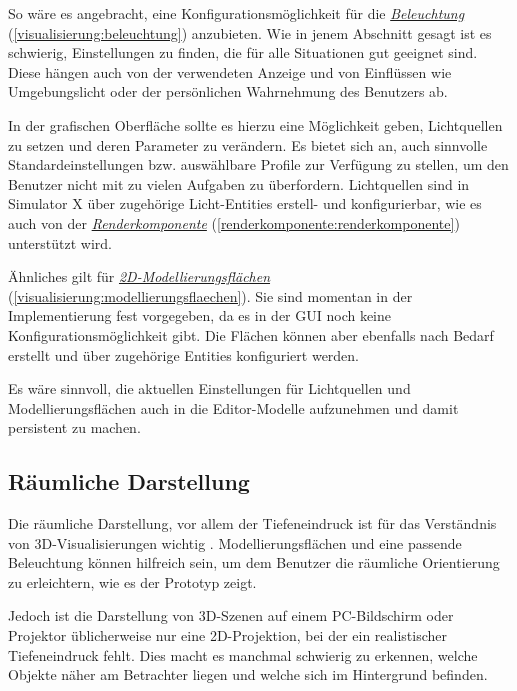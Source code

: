 \documentclass[a4paper,10pt]{sphinxmanual}
\begin{document}
So wäre es angebracht, eine Konfigurationsmöglichkeit für die {\hyperref[visualisierung:beleuchtung]{\emph{Beleuchtung}}} (\autoref*{visualisierung:beleuchtung}) anzubieten.
Wie in jenem Abschnitt gesagt ist es schwierig, Einstellungen zu finden, die für alle Situationen gut geeignet sind.
Diese hängen auch von der verwendeten Anzeige und von Einflüssen wie Umgebungslicht oder der persönlichen Wahrnehmung des Benutzers ab.

In der grafischen Oberfläche sollte es hierzu eine Möglichkeit geben, Lichtquellen zu setzen und deren Parameter zu verändern.
Es bietet sich an, auch sinnvolle Standardeinstellungen bzw. auswählbare Profile zur Verfügung zu stellen, um den Benutzer nicht mit zu vielen Aufgaben zu überfordern.
Lichtquellen sind in Simulator X über zugehörige Licht-Entities erstell- und konfigurierbar, wie es auch von der {\hyperref[renderkomponente:renderkomponente]{\emph{Renderkomponente}}} (\autoref*{renderkomponente:renderkomponente}) unterstützt wird.

Ähnliches gilt für {\hyperref[visualisierung:modellierungsflaechen]{\emph{2D-Modellierungsflächen}}} (\autoref*{visualisierung:modellierungsflaechen}). Sie sind momentan in der Implementierung fest vorgegeben, da es in der GUI noch keine Konfigurationsmöglichkeit gibt.
Die Flächen können aber ebenfalls nach Bedarf erstellt und über zugehörige Entities konfiguriert werden.

Es wäre sinnvoll, die aktuellen Einstellungen für Lichtquellen und Modellierungsflächen auch in die Editor-Modelle aufzunehmen und damit persistent zu machen.


\subsection{Räumliche Darstellung}
\label{visualisierung:raumliche-darstellung}
Die räumliche Darstellung, vor allem der Tiefeneindruck ist für das Verständnis von 3D-Visualisierungen wichtig \cite{wickens_three_1989} \cite{ware_visualizing_2008}.
Modellierungsflächen und eine passende Beleuchtung können hilfreich sein, um dem Benutzer die räumliche Orientierung zu erleichtern, wie es der Prototyp zeigt.

Jedoch ist die Darstellung von 3D-Szenen auf einem PC-Bildschirm oder Projektor üblicherweise nur eine 2D-Projektion, bei der ein realistischer Tiefeneindruck fehlt.
Dies macht es manchmal schwierig zu erkennen, welche Objekte näher am Betrachter liegen und welche sich im Hintergrund befinden.
\end{document}
